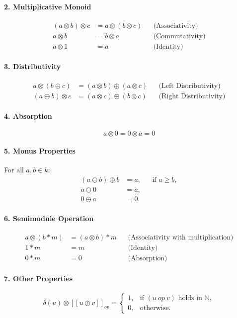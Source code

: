 \begin{toappendix}
\paragraph{2. Multiplicative Monoid}
\[
\begin{aligned}
(a \otimes b) \otimes c &= a \otimes (b \otimes c) && \text{(Associativity)} \\
a \otimes b &= b \otimes a && \text{(Commutativity)} \\
a \otimes 1 &= a && \text{(Identity)}
\end{aligned}
\]

\paragraph{3. Distributivity}
\[
\begin{aligned}
a \otimes (b \oplus c) &= (a \otimes b) \oplus (a \otimes c) && \text{(Left Distributivity)} \\
(a \oplus b) \otimes c &= (a \otimes c) \oplus (b \otimes c) && \text{(Right Distributivity)}
\end{aligned}
\]

\paragraph{4. Absorption}
\[
a \otimes 0 = 0 \otimes a = 0
\]

\paragraph{5. Monus Properties}
For all \( a, b \in k \):
\[
\begin{aligned}
(a \ominus b) \oplus b &= a, && \text{if } a \ge b, \\
a \ominus 0 &= a, \\
0 \ominus a &= 0.
\end{aligned}
\]

\paragraph{6. Semimodule Operation}
\[
\begin{aligned}
a \otimes (b * m) &= (a \otimes b) * m && \text{(Associativity with multiplication)} \\
1 * m &= m && \text{(Identity)} \\
0 * m &= 0 && \text{(Absorption)}
\end{aligned}
\]

\paragraph{7. Other Properties}
\[
\delta(u) \otimes [[u \oslash v]]_{\textit{op}} =
\begin{cases}
1, & \text{if } (u \ \textit{op}\ v) \text{ holds in } \mathbb{N}, \\
0, & \text{otherwise.}
\end{cases}
\]

\end{toappendix}
